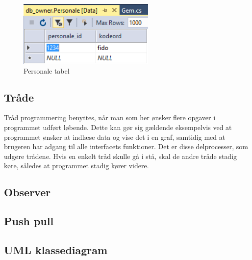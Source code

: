 \begin{figure}[H]
	\centering
	\includegraphics[width=0.6\textwidth]{Figurer/SoftwareImplementering/database}
	\caption{Personale tabel}
	\label{personaletabel}
\end{figure}

\subsection{Tråde}
Tråd programmering benyttes, når man som her ønsker flere opgaver i programmet udført løbende. Dette kan gør sig gældende eksempelvis ved at programmet ønsker at indlæse data og vise det i en graf, samtidig med at brugeren har adgang til alle interfacets funktioner. Det er disse delprocesser, som udgøre trådene. Hvis en enkelt tråd skulle gå i stå, skal de andre tråde stadig køre, således at programmet stadig kører videre. 
\subsection{Observer}
\subsection{Push pull}


\subsection{UML klassediagram}\label{UML klassediagram}


 








